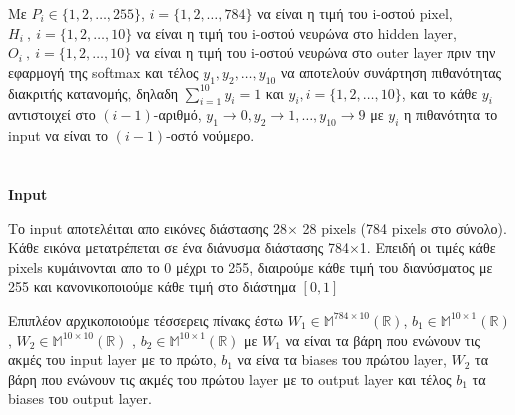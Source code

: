\documentclass[a4paper,12pt]{article}
\begin{document}
Με $P_i\in \{1,2,\dots,255 \} $, $i= \{1,2, \dots , 784 \}$ να είναι η τιμή του i-οστού pixel, $H_i \ ,  \ i = \{1,2, \dots, 10 \}$ να είναι η τιμή του i-οστού νευρώνα στο hidden layer, $O_i \ , \ i = \{1,2,\dots,10 \}$ να είναι η τιμή του i-οστού νευρώνα στο outer layer πριν την εφαρμογή της softmax και τέλος $y_1, y_2, \dots , y_{10}$ να αποτελούν συνάρτηση πιθανότητας διακριτής κατανομής, δηλαδη $\sum_{i=1}^{10}y_i = 1$ και $y_i, i = \{1,2,\dots , 10 \}$, και το κάθε $y_i$ αντιστοιχεί στο $(i-1)$-αριθμό, $y_1 \to 0, y_2 \to 1 , \dots , y_{10} \to 9$ με $y_i$ η πιθανότητα το input να είναι το $(i-1)$-οστό νούμερο.


\newpage

\section*{}
\begin{center}
    \Large \textbf{Input}
\end{center}



Το input αποτελέιται απο εικόνες διάστασης 28$\times$ 28 pixels (784 pixels στο σύνολο). Κάθε εικόνα μετατρέπεται σε ένα διάνυσμα διάστασης 784$\times$1. Επειδή οι τιμές κάθε pixels κυμάινονται απο το 0 μέχρι το 255, διαιρούμε κάθε τιμή του διανύσματος με 255 και κανονικοποιούμε κάθε τιμή στο διάστημα $[0,1]$

Επιπλέον αρχικοποιούμε τέσσερεις πίνακς έστω $W_1 \in \mathbb{M}^{784 \times 10}(\mathbb{R})$, $b_1 \in \mathbb{M}^{10 \times 1}(\mathbb{R})$, $W_2 \in \mathbb{M}^{10\times 10}(\mathbb{R})$ , $b_2 \in \mathbb{M}^{10 \times 1}(\mathbb{R})$ με $W_1$ να είναι τα βάρη που ενώνουν τις ακμές του input layer με το πρώτο, $b_1$ να είνα τα biases του πρώτου layer, $W_2$ τα βάρη που ενώνουν τις ακμές του πρώτου layer με το output layer και τέλος $b_1$ τα biases του output layer. 
\end{document}
